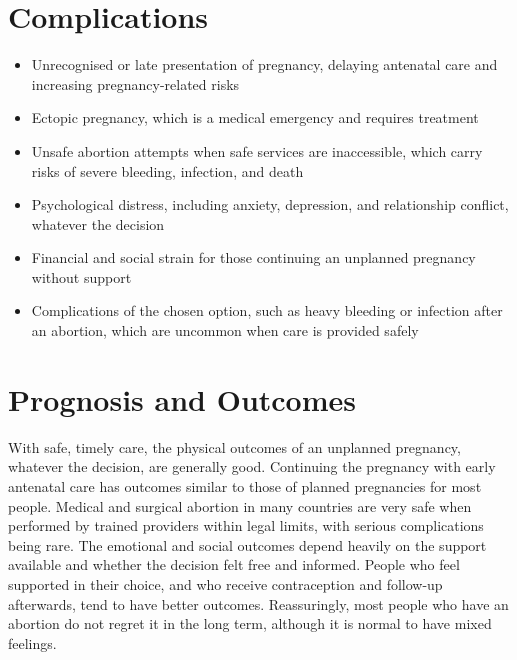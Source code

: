 \section*{Complications}
\begin{itemize}
    \item Unrecognised or late presentation of pregnancy, delaying antenatal care and increasing pregnancy-related risks
    \item Ectopic pregnancy, which is a medical emergency and requires treatment
    \item Unsafe abortion attempts when safe services are inaccessible, which carry risks of severe bleeding, infection, and death
    \item Psychological distress, including anxiety, depression, and relationship conflict, whatever the decision
    \item Financial and social strain for those continuing an unplanned pregnancy without support
    \item Complications of the chosen option, such as heavy bleeding or infection after an abortion, which are uncommon when care is provided safely
\end{itemize}

\section*{Prognosis and Outcomes}
With safe, timely care, the physical outcomes of an unplanned pregnancy, whatever the decision, are generally good. Continuing the pregnancy with early antenatal care has outcomes similar to those of planned pregnancies for most people. Medical and surgical abortion in many countries are very safe when performed by trained providers within legal limits, with serious complications being rare. The emotional and social outcomes depend heavily on the support available and whether the decision felt free and informed. People who feel supported in their choice, and who receive contraception and follow-up afterwards, tend to have better outcomes. Reassuringly, most people who have an abortion do not regret it in the long term, although it is normal to have mixed feelings.

